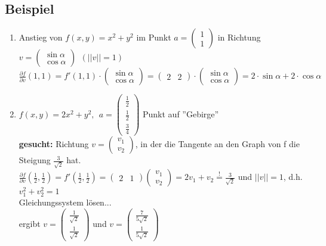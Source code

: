 \subsection{Beispiel}
\begin{enumerate}
	\item
	Anstieg von $f(x,y)=x^2+y^2$ im Punkt $a=\begin{pmatrix}1 \\ 1 \end{pmatrix}$ in Richtung $v=\begin{pmatrix}\sin \alpha \\ \cos \alpha\end{pmatrix} \ \ (||v||=1)$\\
	$\frac{\partial f}{\partial v}(1,1)=f'(1,1)\cdot \begin{pmatrix}\sin \alpha \\ \cos \alpha\end{pmatrix}=\begin{pmatrix}2 & 2\end{pmatrix}\cdot \begin{pmatrix}\sin \alpha \\ \cos \alpha	\end{pmatrix}=2\cdot \sin \alpha+ 2\cdot \cos\alpha$
	
	\item
	$f(x,y)=2x^2+y^2, \ \ a=\begin{pmatrix}\frac{1}{2} \\ \frac{1}{2} \\ \frac{3}{4}\end{pmatrix}$ Punkt auf ''Gebirge''\\
	\textbf{gesucht:} Richtung $v=\begin{pmatrix}v_1 \\ v_2\end{pmatrix}$, in der die Tangente an den Graph von f die Steigung $\frac{3}{\sqrt{2}}$ hat.\\
	$\frac{\partial f}{\partial v}\left(\frac{1}{2},\frac{1}{2}\right)=f'\left(\frac{1}{2},\frac{1}{2}\right) = \begin{pmatrix}2 & 1\end{pmatrix}\begin{pmatrix}v_1 \\ v_2\end{pmatrix}=2v_1+v_2 \stackrel{!}{=} \frac{3}{\sqrt{2}}$ und $||v||=1$, d.h. $v_1^2+v_2^2=1$\\
	Gleichungssystem lösen...\\
	ergibt $v=\begin{pmatrix}\frac{1}{\sqrt{2}} \\ \frac{1}{\sqrt{2}}\end{pmatrix}$ und $v=\begin{pmatrix}\frac{7}{5\sqrt{2}} \\ \frac{1}{5 \sqrt{2}}\end{pmatrix}$
\end{enumerate}


